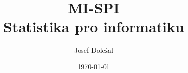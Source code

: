 \documentclass[czech]{article}
\author{Josef Doležal}
\date{\today}
\title{MI-SPI\\Statistika pro informatiku}
\newcommand{\lecture}[1]{
    \newpage
    
}
\begin{document}
\maketitle
\newpage

\tableofcontents

\lecture{01-common-terms}
\lecture{02-random-variable}
\lecture{03-random-vectors}
\lecture{05-entropy}
\lecture{06-code-theory}
\lecture{07-differencial-entropy}
\lecture{08-limits}
\lecture{09-statistics}
\lecture{10-hypothesis}
\lecture{11-hypothesis-2}
\lecture{13-histograms}
\lecture{14-random-processes}
\lecture{15-random-processes-construction}
\end{document}
